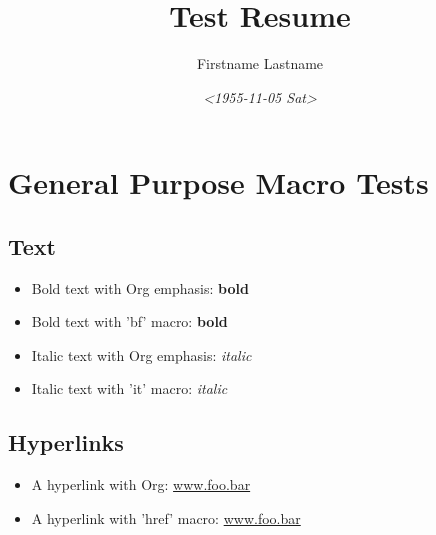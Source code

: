 \documentclass[11pt,letterpaper,sans]{moderncv}
\author{Firstname Lastname}
\date{\textit{<1955-11-05 Sat>}}
\title{Test Resume}
\begin{document}


\section{General Purpose Macro Tests}
\label{sec:org8ac2cc1}


\subsection{Text}
\label{sec:org12b4f4b}

\begin{itemize}
\item Bold text with Org emphasis: \textbf{bold}
\item Bold text with 'bf' macro: \textbf{bold}
\item Italic text with Org emphasis: \emph{italic}
\item Italic text with 'it' macro: \emph{italic}
\end{itemize}


\subsection{Hyperlinks}
\label{sec:orgac8c43b}
\begin{itemize}
\item A hyperlink with Org: \href{https://www.foo.bar}{www.foo.bar}
\item A hyperlink with 'href' macro: \href{https://www.foo.bar}{www.foo.bar}
\end{itemize}
\end{document}
